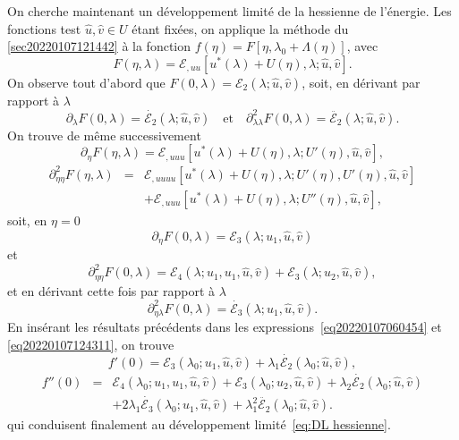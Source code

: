 \documentclass{article}
\newcommand{\nocomma}{}
\newcommand{\nosymbol}{}
\begin{document}
On cherche maintenant un d{\'e}veloppement limit{\'e} de la hessienne de
l'{\'e}nergie. Les fonctions test $\hat{u}, \hat{v} \in U$ {\'e}tant
fix{\'e}es, on applique la m{\'e}thode du
{\textsection}\ref{sec20220107121442} {\`a} la fonction $f (\eta) = F [\eta,
\lambda_0 + \Lambda (\eta)]$, avec
\[ F (\eta, \lambda) =\mathcal{E}_{, u \nocomma u} [u^{\ast} (\lambda) + U
   (\eta), \lambda ; \hat{u}, \hat{v}] . \]
On observe tout d'abord que $F (0, \lambda) =\mathcal{E}_2 (\lambda ; \hat{u},
\hat{v})$, soit, en d{\'e}rivant par rapport {\`a} $\lambda$
\[ \partial_{\lambda} F (0, \lambda) = \dot{\mathcal{E}_2} (\lambda ; \hat{u},
   \hat{v}) \quad \text{et} \quad \partial_{\lambda \nocomma \lambda}^2 F (0,
   \lambda) = \ddot{\mathcal{E}_2} (\lambda ; \hat{u}, \hat{v}) . \]
On trouve de m{\^e}me successivement
\[ \partial_{\eta} F (\eta, \lambda) =\mathcal{E}_{, u \nocomma u \nocomma u}
   [u^{\ast} (\lambda) + U (\eta), \lambda ; U' (\eta), \hat{u}, \hat{v}], \]
\begin{eqnarray}
  \partial_{\eta \nocomma \eta}^2 F (\eta, \lambda) & = & \mathcal{E}_{, u
  \nocomma u \nocomma u \nocomma u} [u^{\ast} (\lambda) + U (\eta), \lambda ;
  U' (\eta), U' (\eta), \hat{u}, \hat{v}] \nonumber\\
  &  & \nosymbol +\mathcal{E}_{, u \nocomma u \nocomma u} [u^{\ast} (\lambda)
  + U (\eta), \lambda ; U'' (\eta), \hat{u}, \hat{v}], \nonumber
\end{eqnarray}
soit, en $\eta = 0$
\[ \partial_{\eta} F (0, \lambda) =\mathcal{E}_3 (\lambda ; u_1, \hat{u},
   \hat{v}) \text{} \]
et
\[ \partial_{\eta \nocomma \eta}^2 F (0, \lambda) =\mathcal{E}_4 (\lambda ;
   u_1, u_1, \hat{u}, \hat{v}) +\mathcal{E}_3 (\lambda ; u_2, \hat{u},
   \hat{v}), \]
et en d{\'e}rivant cette fois par rapport {\`a} $\lambda$
\[ \partial_{\eta \nocomma \lambda}^2 F (0, \lambda) = \dot{\mathcal{E}_3}
   (\lambda ; u_1, \hat{u}, \hat{v}) . \]
En ins{\'e}rant les r{\'e}sultats pr{\'e}c{\'e}dents dans les
expressions~\eqref{eq20220107060454} et \eqref{eq20220107124311}, on trouve
\[ f' (0) =\mathcal{E}_3 (\lambda_0 ; u_1, \hat{u}, \hat{v}) + \lambda_1
   \dot{\mathcal{E}_2} (\lambda_0 ; \hat{u}, \hat{v}), \]
\begin{eqnarray}
  f'' (0) & = & \mathcal{E}_4 (\lambda_0 ; u_1, u_1, \hat{u}, \hat{v})
  +\mathcal{E}_3 (\lambda_0 ; u_2, \hat{u}, \hat{v}) + \lambda_2
  \dot{\mathcal{E}_2} (\lambda_0 ; \hat{u}, \hat{v}) \nonumber\\
  &  & \nosymbol \nosymbol + 2 \lambda_1  \dot{\mathcal{E}_3} (\lambda_0 ;
  u_1, \hat{u}, \hat{v}) + \lambda_1^2  \ddot{\mathcal{E}_2} (\lambda_0 ;
  \hat{u}, \hat{v}) . \nonumber
\end{eqnarray}
qui conduisent finalement au d{\'e}veloppement limit{\'e}~\eqref{eq:DL
hessienne}.
\end{document}
